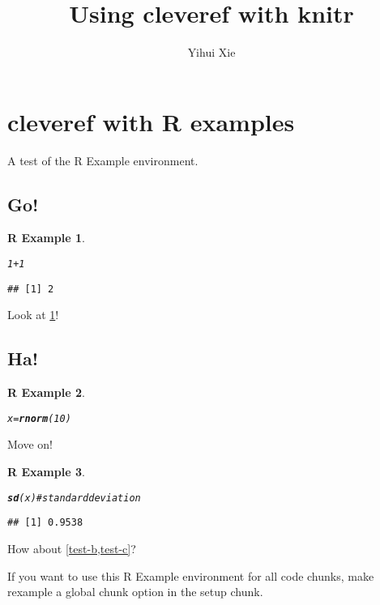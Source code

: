 \documentclass{article}\usepackage[]{graphicx}\usepackage[]{color}
\title{Using cleveref with knitr}
\author{Yihui Xie}
\makeatletter
\newcommand{\hlnum}[1]{\textcolor[rgb]{0.686,0.059,0.569}{#1}}%
\newcommand{\hlcom}[1]{\textcolor[rgb]{0.678,0.584,0.686}{\textit{#1}}}%
\newcommand{\hlopt}[1]{\textcolor[rgb]{0,0,0}{#1}}%
\newcommand{\hlstd}[1]{\textcolor[rgb]{0.345,0.345,0.345}{#1}}%
\newcommand{\hlkwb}[1]{\textcolor[rgb]{0.69,0.353,0.396}{#1}}%
\newcommand{\hlkwd}[1]{\textcolor[rgb]{0.737,0.353,0.396}{\textbf{#1}}}%
\newenvironment{kframe}{%
 \def\at@end@of@kframe{}%
 \ifinner\ifhmode%
  \def\at@end@of@kframe{\end{minipage}}%
  \begin{minipage}{\columnwidth}%
 \fi\fi%
 \def\FrameCommand##1{\hskip\@totalleftmargin \hskip-\fboxsep
 \colorbox{shadecolor}{##1}\hskip-\fboxsep
     \hskip-\linewidth \hskip-\@totalleftmargin \hskip\columnwidth}%
 \MakeFramed {\advance\hsize-\width
   \@totalleftmargin\z@ \linewidth\hsize
   \@setminipage}}%
 {\par\unskip\endMakeFramed%
 \at@end@of@kframe}
\newenvironment{knitrout}{}{} %
\newtheorem{rexample}{R Example}[section]
\makeatother
\begin{document}
\maketitle



\section{cleveref with R examples}

A test of the R Example environment.

\subsection{Go!}

\begin{knitrout}
\color{fgcolor}\begin{kframe}
\begin{rexample}\label{test-a}\hfill{}\begin{alltt}
\hlnum{1} \hlopt{+} \hlnum{1}
\end{alltt}
\begin{verbatim}
## [1] 2
\end{verbatim}
\end{rexample}\end{kframe}
\end{knitrout}

Look at \cref{test-a}!

\subsection{Ha!}

\begin{knitrout}
\color{fgcolor}\begin{kframe}
\begin{rexample}\label{test-b}\hfill{}\begin{alltt}
\hlstd{x} \hlkwb{=} \hlkwd{rnorm}\hlstd{(}\hlnum{10}\hlstd{)}
\end{alltt}
\end{rexample}\end{kframe}
\end{knitrout}

Move on!

\begin{knitrout}
\color{fgcolor}\begin{kframe}
\begin{rexample}\label{test-c}\hfill{}\begin{alltt}
\hlkwd{sd}\hlstd{(x)}  \hlcom{# standard deviation}
\end{alltt}
\begin{verbatim}
## [1] 0.9538
\end{verbatim}
\end{rexample}\end{kframe}
\end{knitrout}

How about \cref{test-b,test-c}?

If you want to use this R Example environment for all code chunks, make rexample a global chunk option in the setup chunk.
\end{document}
